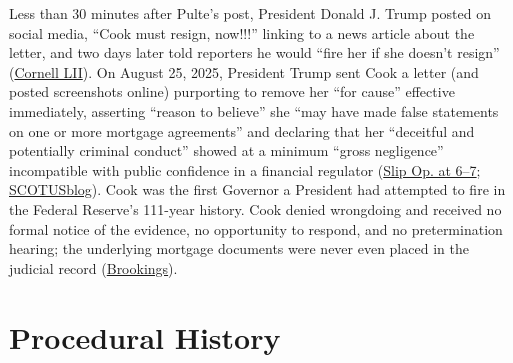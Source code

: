 \documentclass[12pt]{article}
\begin{document}
Less than 30 minutes after Pulte's post, President Donald J. Trump posted on social media, ``Cook must resign, now!!!'' linking to a news article about the letter, and two days later told reporters he would ``fire her if she doesn't resign'' (\href{https://www.law.cornell.edu/supremecourt/text/25A312}{Cornell LII}). On August 25, 2025, President Trump sent Cook a letter (and posted screenshots online) purporting to remove her ``for cause'' effective immediately, asserting ``reason to believe'' she ``may have made false statements on one or more mortgage agreements'' and declaring that her ``deceitful and potentially criminal conduct'' showed at a minimum ``gross negligence'' incompatible with public confidence in a financial regulator (\href{https://www.supremecourt.gov/opinions/25pdf/25a312_5468.pdf}{Slip Op. at 6--7}; \href{https://www.scotusblog.com/2026/06/court-prevents-trump-from-firing-fed-governor/}{SCOTUSblog}). Cook was the first Governor a President had attempted to fire in the Federal Reserve's 111-year history. Cook denied wrongdoing and received no formal notice of the evidence, no opportunity to respond, and no pretermination hearing; the underlying mortgage documents were never even placed in the judicial record (\href{https://www.brookings.edu/articles/fed-independence-after-trump-v-cook/}{Brookings}).

\section{Procedural History}
\end{document}
